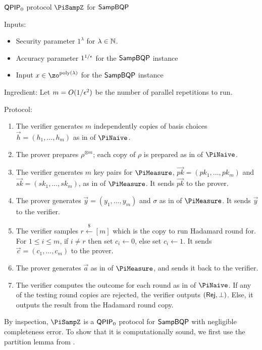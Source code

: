 \begin{protocol}{$\operatorname{\mathsf{QPIP}}_0$ protocol $\PiSampZ$ for $\operatorname{\mathsf{SampBQP}}$}
	\label{proto:QPIP0samp}

	Inputs:
	\begin{itemize}
		\item Security parameter $1^\lambda$ for $\lambda\in\mathbb{N}$.
		\item Accuracy parameter $1^{1/\epsilon}$ for the $\operatorname{\mathsf{SampBQP}}$ instance
		\item Input $x\in\zo^{\poly(\lambda)}$ for the $\operatorname{\mathsf{SampBQP}}$ instance
	\end{itemize}

	Ingredient: Let $m=O(1/\epsilon^2)$ be the number of parallel repetitions to run.

	Protocol:
	\begin{enumerate}
		\item The verifier generates $m$ independently copies of basis choices $\vec{h}=(h_1,\ldots,h_m)$ as in  of $\PiNaive$.
		\item The prover prepares $\rho^{\otimes m}$; each copy of $\rho$ is prepared as in  of $\PiNaive$.
		\item The verifier generates $m$ key pairs for $\PiMeasure$, $\vec{pk}=(pk_1,\ldots,pk_m)$ and $\vec{sk}=(sk_1,\ldots,sk_m)$, as in  of $\PiMeasure$.
			It sends $\vec{pk}$ to the prover.
		\item The prover generates $\vec{y}=(y_1,\ldots,y_m)$ and $\sigma$ as in  of $\PiMeasure$.
			It sends $\vec{y}$ to the verifier.
		\item The verifier samples $r\xleftarrow{\$}[m]$ which is the copy to run Hadamard round for.
			For $1\leq i\leq m$, if $i\ne r$ then set $c_i\leftarrow 0$, else set $c_i\leftarrow 1$.
			It sends $\vec{c}=(c_1,\ldots,c_m)$ to the prover.
		\item The prover generates $\vec{a}$ as in  of $\PiMeasure$, and sends it back to the verifier.
		\item The verifier computes the outcome for each round as in  of $\PiNaive$.
			If any of the testing round copies are rejected, the verifier outputs $(\mathsf{Rej}, \bot)$.
			Else, it outputs the result from the Hadamard round copy.
	\end{enumerate}
\end{protocol}
By inspection, $\PiSampZ$ is a $\operatorname{\mathsf{QPIP}}_0$ protocol for $\operatorname{\mathsf{SampBQP}}$ with negligible completeness error.
To show that it is computationally sound, we first use the partition lemma from \cite{arXiv:ChiaChungYam19}.
